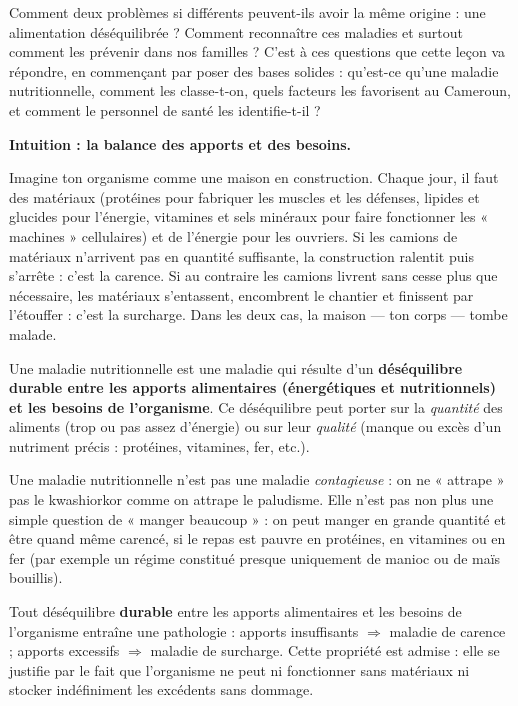 \documentclass[11pt]{article}
\newcommand{\cle}[1]{{\popxbold\color{popdark}#1}}
\newcounter{popsec}
\newcounter{popsub}
\newcommand{\courssub}[1]{%
  \stepcounter{popsub}%
  \par\vspace{9pt}\noindent{\popxbold\fontsize{11.5}{13}\selectfont\color{popink}{\color{poporange}\thepopsec.\thepopsub}\hspace{6pt}#1}\par\nopagebreak\vspace{4pt}
}
\begin{document}
Comment deux problèmes si différents peuvent-ils avoir la même origine : une alimentation déséquilibrée ? Comment reconnaître ces maladies et surtout comment les prévenir dans nos familles ? C'est à ces questions que cette leçon va répondre, en commençant par poser des bases solides : qu'est-ce qu'une maladie nutritionnelle, comment les classe-t-on, quels facteurs les favorisent au Cameroun, et comment le personnel de santé les identifie-t-il ?

\courssub{Qu'est-ce qu'une maladie nutritionnelle ?}

\textbf{Intuition : la balance des apports et des besoins.}

Imagine ton organisme comme une maison en construction. Chaque jour, il faut des matériaux (protéines pour fabriquer les muscles et les défenses, lipides et glucides pour l'énergie, vitamines et sels minéraux pour faire fonctionner les « machines » cellulaires) et de l'énergie pour les ouvriers. Si les camions de matériaux n'arrivent pas en quantité suffisante, la construction ralentit puis s'arrête : c'est la \cle{carence}. Si au contraire les camions livrent sans cesse plus que nécessaire, les matériaux s'entassent, encombrent le chantier et finissent par l'étouffer : c'est la \cle{surcharge}. Dans les deux cas, la maison — ton corps — tombe malade.

\begin{definition}
Une \cle{maladie nutritionnelle} est une maladie qui résulte d'un \textbf{déséquilibre durable entre les apports alimentaires (énergétiques et nutritionnels) et les besoins de l'organisme}. Ce déséquilibre peut porter sur la \emph{quantité} des aliments (trop ou pas assez d'énergie) ou sur leur \emph{qualité} (manque ou excès d'un nutriment précis : protéines, vitamines, fer, etc.).
\end{definition}

\begin{attention}
Une maladie nutritionnelle n'est pas une maladie \emph{contagieuse} : on ne « attrape » pas le kwashiorkor comme on attrape le paludisme. Elle n'est pas non plus une simple question de « manger beaucoup » : on peut manger en grande quantité et être quand même carencé, si le repas est pauvre en protéines, en vitamines ou en fer (par exemple un régime constitué presque uniquement de manioc ou de maïs bouillis).
\end{attention}

\begin{propriete}
Tout déséquilibre \textbf{durable} entre les apports alimentaires et les besoins de l'organisme entraîne une pathologie : apports insuffisants $\Rightarrow$ maladie de \cle{carence} ; apports excessifs $\Rightarrow$ maladie de \cle{surcharge}. Cette propriété est admise : elle se justifie par le fait que l'organisme ne peut ni fonctionner sans matériaux ni stocker indéfiniment les excédents sans dommage.
\end{propriete}
\end{document}
